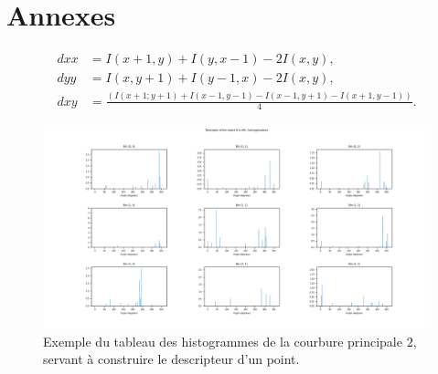 \documentclass[
	a4paper, %
	10pt, %
	unnumberedsections, %
	twoside, %
]{LTJournalArticle}
\begin{document}
\section{Annexes}

\begin{equation} \label{eq:hess_coefs}
	\begin{split}
		dxx & = I(x+1, y) + I(y, x-1) - 2I(x, y),                                              \\
		dyy & = I(x, y+1) + I(y-1, x) - 2I(x, y),                                              \\
		dxy & = \frac{\left(I(x+1; y+1) + I(x-1, y-1) - I(x-1, y+1) - I(x+1, y-1) \right)}{4}.
	\end{split}
\end{equation}

\begin{figure}[H]
	\centering
	\includegraphics[width=\textwidth]{images/histo_result.png}
	\caption{Exemple du tableau des histogrammes de la courbure principale $2$,
		servant à construire le descripteur d'un point.}
	\label{figure:fig_hist}
\end{figure}

\clearpage
\end{document}
